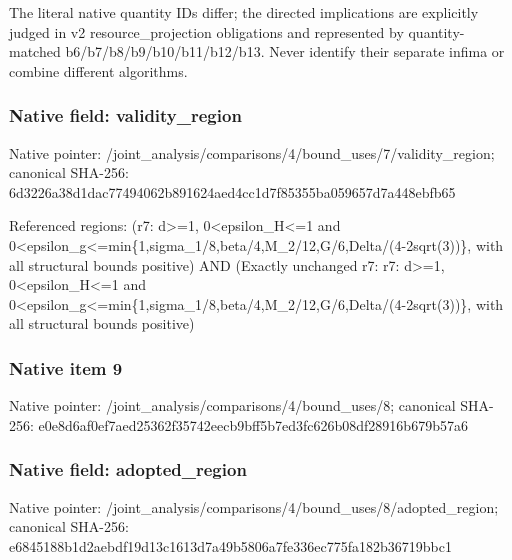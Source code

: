 \documentclass[10pt,a4paper]{article}
\begin{document}
\begingroup\raggedright\sloppy The literal native quantity IDs differ;\allowbreak{} the directed implications are explicitly judged in v2 resource\_\allowbreak{}projection obligations and represented by quantity-matched b6/\allowbreak{}b7/\allowbreak{}b8/\allowbreak{}b9/\allowbreak{}b10/\allowbreak{}b11/\allowbreak{}b12/\allowbreak{}b13. Never identify their separate infima or combine different algorithms.\par\endgroup

\subsubsection{Native field: validity\_\allowbreak{}region}
Native pointer: /joint\_\allowbreak{}analysis/comparisons/4/bound\_\allowbreak{}uses/7/validity\_\allowbreak{}region; canonical SHA-256: 6d3226a38d1dac77494062b891624aed4cc1d7f85355ba059657d7a448ebfb65

\begingroup\raggedright\sloppy Referenced regions:\allowbreak{} (r7:\allowbreak{} d>=\allowbreak{}1,\allowbreak{} 0<epsilon\_\allowbreak{}H<=\allowbreak{}1 and 0<epsilon\_\allowbreak{}g<=\allowbreak{}min\{1,\allowbreak{}sigma\_\allowbreak{}1/\allowbreak{}8,\allowbreak{}beta/\allowbreak{}4,\allowbreak{}M\_\allowbreak{}2/\allowbreak{}12,\allowbreak{}G/\allowbreak{}6,\allowbreak{}Delta/\allowbreak{}(4-2sqrt(3))\},\allowbreak{} with all structural bounds positive) AND (Exactly unchanged r7:\allowbreak{} r7:\allowbreak{} d>=\allowbreak{}1,\allowbreak{} 0<epsilon\_\allowbreak{}H<=\allowbreak{}1 and 0<epsilon\_\allowbreak{}g<=\allowbreak{}min\{1,\allowbreak{}sigma\_\allowbreak{}1/\allowbreak{}8,\allowbreak{}beta/\allowbreak{}4,\allowbreak{}M\_\allowbreak{}2/\allowbreak{}12,\allowbreak{}G/\allowbreak{}6,\allowbreak{}Delta/\allowbreak{}(4-2sqrt(3))\},\allowbreak{} with all structural bounds positive)\par\endgroup

\subsubsection{Native item 9}
Native pointer: /joint\_\allowbreak{}analysis/comparisons/4/bound\_\allowbreak{}uses/8; canonical SHA-256: e0e8d6af0ef7aed25362f35742eecb9bff5b7ed3fc626b08df28916b679b57a6

\subsubsection{Native field: adopted\_\allowbreak{}region}
Native pointer: /joint\_\allowbreak{}analysis/comparisons/4/bound\_\allowbreak{}uses/8/adopted\_\allowbreak{}region; canonical SHA-256: e6845188b1d2aebdf19d13c1613d7a49b5806a7fe336ec775fa182b36719bbc1
\end{document}
